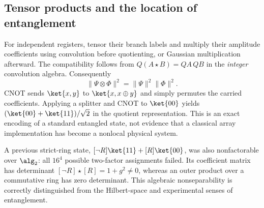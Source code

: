 \subsection{Tensor products and the location of entanglement}
For independent registers, tensor their branch labels and multiply their amplitude coefficients using convolution before quotienting, or Gaussian multiplication afterward. The compatibility follows from $Q(A\star B)=QA\,QB$ in the \emph{integer} convolution algebra. Consequently
\begin{equation}
 \|\Psi\otimes\Phi\|^2=\|\Psi\|^2\|\Phi\|^2.
\end{equation}
CNOT sends $\ket{x,y}$ to $\ket{x,x\oplus y}$ and simply permutes the carried coefficients. Applying a splitter and CNOT to $\ket{00}$ yields $(\ket{00}+\ket{11})/\sqrt2$ in the quotient representation. This is an exact encoding of a standard entangled state, not evidence that a classical array implementation has become a nonlocal physical system.

A previous strict-ring state, $[\neg R]\ket{11}+[R]\ket{00}$, was also nonfactorable over $\alg_2$: all $16^4$ possible two-factor assignments failed. Its coefficient matrix has determinant $[\neg R]\star[R]=1+g^2\ne0$, whereas an outer product over a commutative ring has zero determinant. This algebraic nonseparability is correctly distinguished from the Hilbert-space and experimental senses of entanglement.
